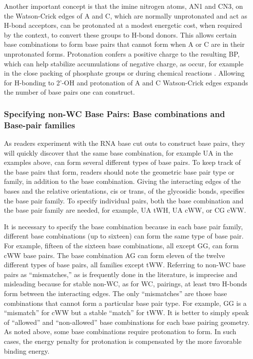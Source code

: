 Another important concept is that the imine nitrogen atoms, AN1 and CN3, on the
Watson-Crick edges of A and C, which are normally unprotonated and act as H-bond
acceptors, can be protonated at a modest energetic cost, when required by the
context, to convert these groups to H-bond donors. This allows certain base
combinations to form base pairs that cannot form when A or C are in their
unprotonated forms. Protonation confers a positive charge to the resulting BP,
which can help stabilize accumulations of negative charge, as occur, for example
in the close packing of phosphate groups or during chemical reactions
\cite{Siegfried2010, Cerrone-Szakal2008a}. Allowing for H-bonding to 2'-OH and
protonation of A and C Watson-Crick edges expands the number of base pairs one
can construct. 

\subsubsection{Specifying non-WC Base Pairs: Base combinations and Base-pair
families}

As readers experiment with the RNA base cut outs to construct base pairs, they
will quickly discover that the same base combination, for example UA in the
examples above, can form several different types of base pairs. To keep track of
the base pairs that form, readers should note the geometric base pair type or
family, in addition to the base combination. Giving the interacting edges of the
bases and the relative orientations, cis or trans, of the glycosidic bonds,
specifies the base pair family. To specify individual pairs, both the base
combination and the base pair family are needed, for example, UA tWH, UA cWW, or
CG cWW. 

It is necessary to specify the base combination because in each base pair
family, different base combinations (up to sixteen) can form the same type of
base pair. For example, fifteen of the sixteen base combinations, all except GG,
can form cWW base pairs. The base combination AG can form eleven of the twelve
different types of base pairs, all families except tWW. Referring to non-WC base
pairs as ``mismatches,'' as is frequently done in the literature, is imprecise and
misleading because for stable non-WC, as for WC, pairings, at least two H-bonds
form between the interacting edges. The only ``mismatches'' are those base
combinations that cannot form a particular base pair type. For example, GG is a
``mismatch'' for cWW but a stable ``match'' for tWW. It is better to simply speak of
``allowed'' and ``non-allowed'' base combinations for each base pairing geometry. As
noted above, some base combinations require protonation to form. In such cases,
the energy penalty for protonation is compensated by the more favorable binding
energy.


